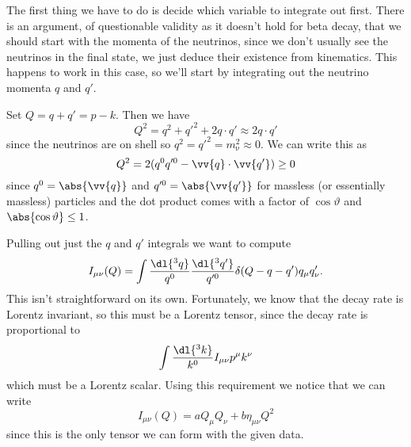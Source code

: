 \documentclass[fleqn]{NotesClass}
\newcommand{\Pnu}{\ensuremath{\upnu}}
\newcommand{\minkowskiMetric}{\eta}
\begin{document}
    The first thing we have to do is decide which variable to integrate out first.
    There is an argument, of questionable validity as it doesn't hold for beta decay, that we should start with the momenta of the neutrinos, since we don't usually see the neutrinos in the final state, we just deduce their existence from kinematics.
    This happens to work in this case, so we'll start by integrating out the neutrino momenta \(q\) and \(q'\).
    
    Set \(Q = q + q' = p - k\).
    Then we have
    \begin{equation}
        Q^2 = q^2 + q'^2 + 2q \cdot q' \approx 2 q \cdot q'
    \end{equation}
    since the neutrinos are on shell so \(q^2 = q'^2 = m_{\Pnu}^2 \approx 0\).
    We can write this as
    \begin{equation}
        Q^2 = 2(q^0 q'^0 - \vv{q} \cdot \vv{q'}) \ge 0
    \end{equation}
    since \(q^0 = \abs{\vv{q}}\) and \(q'^0 = \abs{\vv{q'}}\) for massless (or essentially massless) particles and the dot product comes with a factor of \(\cos\vartheta\) and \(\abs{\cos \vartheta} \le 1\).
    
    Pulling out just the \(q\) and \(q'\) integrals we want to compute
    \begin{equation}
        I_{\mu\nu}(Q) = \int \frac{\dl{^3q}}{q^0} \frac{\dl{^3q'}}{q'^0} \delta(Q - q - q') q_\mu q'_\nu.
    \end{equation}
    This isn't straightforward on its own.
    Fortunately, we know that the decay rate is Lorentz invariant, so this must be a Lorentz tensor, since the decay rate is proportional to
    \begin{equation}
        \int \frac{\dl{^3k}}{k^0} I_{\mu\nu} p^\mu k^\nu
    \end{equation}
    which must be a Lorentz scalar.
    Using this requirement we notice that we can write
    \begin{equation}
        I_{\mu\nu}(Q) = aQ_\mu Q_\nu + b\minkowskiMetric_{\mu\nu}Q^2
    \end{equation}
    since this is the only tensor we can form with the given data.
    
\end{document}
